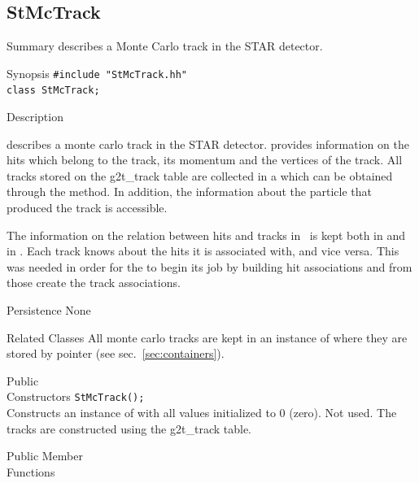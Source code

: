 \subsection{StMcTrack}
\label{sec:StMcTrack}
\begin{Entry}
\item[Summary]
     describes a Monte Carlo track in the STAR detector.

\item[Synopsis]
    \verb+#include "StMcTrack.hh"+\\
    \verb+class StMcTrack;+\\

\item[Description]
    
     describes a monte carlo track in the STAR
    detector.  
     provides information on the
    hits which belong to the track, its momentum and the
    vertices of the track.  All
    tracks stored on the g2t\_track table are collected in a
     which can be obtained through the
     method.
    In addition, the information about the particle that produced
    the track is accessible.
    
    The information on the relation between hits and tracks in
    \StMcEvent\ is kept both in  and in .
    Each track knows about the hits it is associated with, and vice versa.
    This was needed in order for the \StAssociationMaker to begin its job by
    building hit associations and from those create the track associations.
    
\item[Persistence]
    None

\item[Related Classes]
    All monte carlo tracks are kept in an instance of 
    where they are stored by pointer (see sec.~\ref{sec:containers}).

\item[Public\\ Constructors]
    \verb+StMcTrack();+\\
    Constructs an instance of  with all values initialized to 0 (zero).
    Not used.  The tracks are constructed using the g2t\_track table.

\item[Public Member\\ Functions]


\end{Entry}
